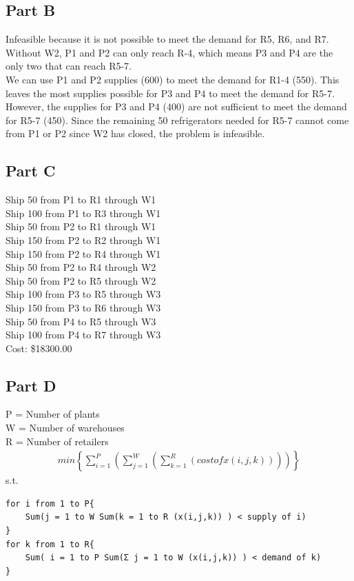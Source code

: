 \documentclass[11pt,letterpaper]{article}
\begin{document}
\subsection*{Part B}
Infeasible because it is not possible to meet the demand for R5, R6, and R7. \\
Without W2, P1 and P2 can only reach R-4, which means P3 and P4 are the only two that can reach R5-7.\\
We can use P1 and P2 supplies (600) to meet the demand for R1-4 (550). This leaves the most supplies possible for P3 and P4 to meet the demand for R5-7.\\
However, the supplies for P3 and P4 (400) are not sufficient to meet the demand for R5-7 (450). Since the remaining 50 refrigerators needed for R5-7 cannot come from P1 or P2 since W2 has closed, the problem is infeasible.

\subsection*{Part C}
	Ship 50 from P1 to R1 through W1 \\
	Ship 100 from P1 to R3 through W1\\
	Ship 50 from P2 to R1 through W1\\
	Ship 150 from P2 to R2 through W1\\
	Ship 150 from P2 to R4 through W1\\
	Ship 50 from P2 to R4 through W2\\
	Ship 50 from P2 to R5 through W2\\
	Ship 100 from P3 to R5 through W3\\
	Ship 150 from P3 to R6 through W3\\
	Ship 50 from P4 to R5 through W3\\
	Ship 100 from P4 to R7 through W3\\
	
	Cost: \$18300.00
	
\subsection*{Part D}
P = Number of plants \\
W = Number of warehouses \\
R = Number of retailers \\

\begin{align*}
min \left\lbrace \sum\limits_{i=1}^P \left( \sum\limits_{j=1}^W \left( \sum\limits_{k=1}^R \left( cost of x(i,j,k)\right)\right)\right) \right\rbrace
\end{align*}
s.t. \\
\begin{verbatim}
for i from 1 to P{
	Sum(j = 1 to W Sum(k = 1 to R (x(i,j,k)) ) < supply of i)
}
for k from 1 to R{
	Sum( i = 1 to P Sum(Σ j = 1 to W (x(i,j,k)) ) < demand of k)
}
\end{verbatim}
\end{document}
